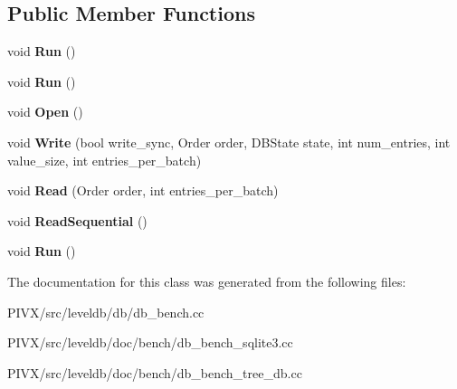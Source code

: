 \subsection*{Public Member Functions}
\begin{DoxyCompactItemize}
\item 
\mbox{\label{classleveldb_1_1_benchmark_a2f262afa0c7d10fcf531fe9657fba490}} 
void {\bfseries Run} ()
\item 
\mbox{\label{classleveldb_1_1_benchmark_a2f262afa0c7d10fcf531fe9657fba490}} 
void {\bfseries Run} ()
\item 
\mbox{\label{classleveldb_1_1_benchmark_a89a3b0da75e6cd2ffb879358e5dd82a6}} 
void {\bfseries Open} ()
\item 
\mbox{\label{classleveldb_1_1_benchmark_a86876b2882d9015610330e69acfdff0d}} 
void {\bfseries Write} (bool write\+\_\+sync, Order order, D\+B\+State state, int num\+\_\+entries, int value\+\_\+size, int entries\+\_\+per\+\_\+batch)
\item 
\mbox{\label{classleveldb_1_1_benchmark_afc9cf258a63488924e172fadc67c12f1}} 
void {\bfseries Read} (Order order, int entries\+\_\+per\+\_\+batch)
\item 
\mbox{\label{classleveldb_1_1_benchmark_a301897d0609459c5e6072db05da6b737}} 
void {\bfseries Read\+Sequential} ()
\item 
\mbox{\label{classleveldb_1_1_benchmark_a2f262afa0c7d10fcf531fe9657fba490}} 
void {\bfseries Run} ()
\end{DoxyCompactItemize}


The documentation for this class was generated from the following files\+:\begin{DoxyCompactItemize}
\item 
P\+I\+V\+X/src/leveldb/db/db\+\_\+bench.\+cc\item 
P\+I\+V\+X/src/leveldb/doc/bench/db\+\_\+bench\+\_\+sqlite3.\+cc\item 
P\+I\+V\+X/src/leveldb/doc/bench/db\+\_\+bench\+\_\+tree\+\_\+db.\+cc\end{DoxyCompactItemize}
